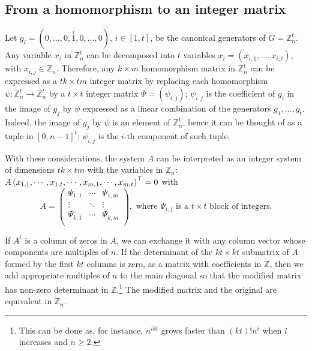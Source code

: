 \documentclass[10pt]{article}
\newcommand{\Z}{\mathbb Z}
\begin{document}
\subsection{From a homomorphism to an integer matrix} \label{s.hom_mat_to_integer_mat}

Let $g_i=(0,\ldots,0,\stackrel{i}{1},0,\ldots,0)$, $i\in [1,t]$, 
be the canonical generators of $G=\Z_n^t$. 
Any variable $x_i$ in $\Z_n^t$ can be decomposed into $t$ variables $x_i=(x_{i,1},\ldots,x_{i,t})$, with $x_{i,j}\in \Z_n$. Therefore, any $k\times m$ homomorphism matrix in $\Z_n^t$ can be expressed as a $t k \times  t m$ integer matrix by replacing each homomorphism $\psi:\Z_n^t\to\Z_n^t$ by a $t\times t$ integer matrix $\Psi=\left(
			\psi_{i,j}\right)$; $\psi_{i,j}$ is the coefficient of $g_i$ in the image of $g_j$ by $\psi$ expressed as a linear combination of the generators $g_1,\ldots,g_t$. Indeed, the image of $g_j$ by $\psi$ is an element of $\Z_n^t$, hence it can be thought of as a tuple in $[0,n-1]^t$; $\psi_{i,j}$ is the $i$-th component of such tuple.


With these considerations, the system $A$ can be interpreted as an integer system of dimensions $t k\times  t m$ with the variables in $\Z_n$:	$A \left(x_{1,1},\cdots,x_{1,t},
	\cdots,\linebreak[1] x_{m,1}\linebreak[1],\linebreak[1]\cdots\linebreak[1],\linebreak[1]x_{m,t} \right)^{\top}=0$ 
with
\begin{displaymath}
A=\left(
		\begin{array}{ccc}
			\Psi_{1,1} & \cdots & \Psi_{1,m} \\
			\vdots & \ddots & \vdots \\
			\Psi_{k,1} & \cdots & \Psi_{k,m} \\
		\end{array}\right), \text{ where $\Psi_{i,j}$ is a $t\times t$ block of integers.} 
\end{displaymath}

If $A^i$ is a column of zeros in $A$, we can exchange it with any column vector whose components are multiples of $n$. 
If the determinant of the $kt\times kt$ submatrix of $A$ formed by the first $kt$ columns is zero, as a matrix with coefficients in $\Z$, then we add appropriate multiples of $n$ to the main diagonal so that the modified matrix has non-zero determinant in $\Z$.\footnote{This can be done as, for instance, $n^{i kt}$ grows faster than $(kt)! n^i$ when $i$ increases and $n\geq2$.} 
The modified matrix and the original 
are equivalent in $\Z_n$.
\end{document}
